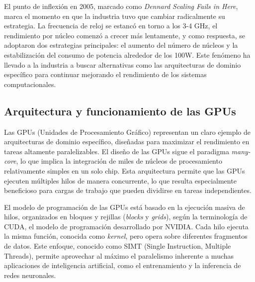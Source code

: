 \documentclass[11pt,spanish,listoffigures,listoftables]{tfgetsinf}
\begin{document}
El punto de inflexión en 2005, marcado como \textit{Dennard Scaling Fails in Here}, marca el momento en que la industria tuvo que cambiar radicalmente su estrategia. La frecuencia de reloj se estancó en torno a los 3-4 GHz, el rendimiento por núcleo comenzó a crecer más lentamente, y como respuesta, se adoptaron dos estrategias principales: el aumento del número de núcleos y la estabilización del consumo de potencia alrededor de los 100W. Este fenómeno ha llevado a la industria a buscar alternativas como las arquitecturas de dominio específico para continuar mejorando el rendimiento de los sistemas computacionales.

\subsection{Arquitectura y funcionamiento de las GPUs}

Las GPUs (Unidades de Procesamiento Gráfico) representan un claro ejemplo de arquitecturas de dominio específico, diseñadas para maximizar el rendimiento en tareas altamente paralelizables. El diseño de las GPUs sigue el paradigma \textit{many-core}, lo que implica la integración de miles de núcleos de procesamiento relativamente simples en un solo chip. Esta arquitectura permite que las GPUs ejecuten múltiples hilos de manera concurrente, lo que resulta especialmente beneficioso para cargas de trabajo que pueden dividirse en tareas independientes.

El modelo de programación de las GPUs está basado en la ejecución masiva de hilos, organizados en bloques y rejillas (\textit{blocks} y \textit{grids}), según la terminología de CUDA, el modelo de programación desarrollado por NVIDIA. Cada hilo ejecuta la misma función, conocida como \textit{kernel}, pero opera sobre diferentes fragmentos de datos. Este enfoque, conocido como SIMT (Single Instruction, Multiple Threads), permite aprovechar al máximo el paralelismo inherente a muchas aplicaciones de inteligencia artificial, como el entrenamiento y la inferencia de redes neuronales.
\end{document}
